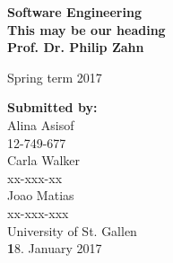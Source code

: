 \documentclass[12pt,a4paper,bibliography=totocnumbered,listof=totocnumbered]{scrartcl}
\begin{document}

\renewcommand{\sectionmark}[1]{\markright{#1}}
\renewcommand{\leftmark}{\rightmark}
\pagestyle{fancy}
\lhead{ }
\chead{ }
\rhead{\thesection\space\contentsname}
\cfoot{ }
\renewcommand{\headrulewidth}{0.4pt}
\renewcommand{\footrulewidth}{0.4pt}

\renewcommand{\thesection}{\Roman{section}}
\renewcommand{\theHsection}{\Roman{section}}

\thispagestyle{empty}
\begin{center}
	
	\vspace*{2cm}
	\Huge
	\textbf{Software Engineering}\\
\vfill
	\Large
	\textbf{This may be our heading}\\
\vfill
	\Large
	\textbf{Prof. Dr. Philip Zahn}\\

	
\vfill


\Large
Spring term 2017

\end{center}

\begin{flushleft}	
	\vfill
	\normalsize
\textbf{Submitted by:} \\
Alina Asisof\\
12-749-677\\ 
Carla Walker\\ 
xx-xxx-xx\\ 
Joao Matias\\ 
xx-xxx-xxx\\ 
University of St. Gallen\\ 
 
\vfill
\textbf 18. January 2017

\end{flushleft}	



\pagebreak
\end{document}
